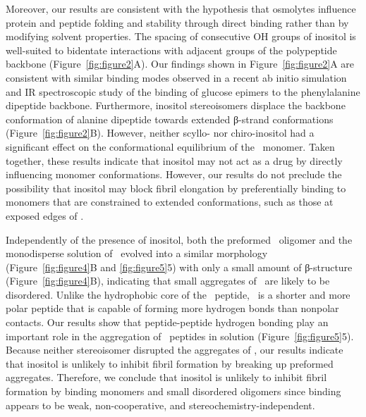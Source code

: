 Moreover, our results are consistent with the hypothesis that osmolytes influence protein and peptide folding and stability through direct binding rather than by modifying solvent properties.\cite{Canchi:2011p53,Lee:2010p59,Street:2006p21} The spacing of consecutive OH groups of inositol is well-suited to bidentate interactions with adjacent groups of the polypeptide backbone (Figure~\ref{fig:figure2}A). Our findings shown in Figure~\ref{fig:figure2}A are consistent with similar binding modes observed in a recent ab initio simulation and IR spectroscopic study of the binding of glucose epimers to the phenylalanine dipeptide backbone.\cite{Cocinero:2011p54} Furthermore, inositol stereoisomers displace the backbone conformation of alanine dipeptide towards extended β-strand conformations (Figure~\ref{fig:figure2}B). However, neither scyllo- nor chiro-inositol had a significant effect on the conformational equilibrium of the \gafour\ monomer. Taken together, these results indicate that inositol may not act as a drug by directly influencing monomer conformations. However, our results do not preclude the possibility that inositol may block fibril elongation by preferentially binding to monomers that are constrained to extended conformations, such as those at exposed edges of \bsheets.

Independently of the presence of inositol, both the preformed \bsheet\ oligomer and the monodisperse solution of \gafour\ evolved into a similar morphology (Figure~\ref{fig:figure4}B and \ref{fig:figure5}5) with only a small amount of β-structure (Figure~\ref{fig:figure4}B), indicating that small aggregates of \gafour\ are likely to be disordered. Unlike the hydrophobic core of the \abeta\ peptide, \gafour\ is a shorter and more polar peptide that is capable of forming more hydrogen bonds than nonpolar contacts. Our results show that peptide-peptide hydrogen bonding play an important role in the aggregation of \gafour\ peptides in solution (Figure~\ref{fig:figure5}5). Because neither stereoisomer disrupted the aggregates of \gafour, our results indicate that inositol is unlikely to inhibit fibril formation by breaking up preformed aggregates. Therefore, we conclude that inositol is unlikely to inhibit fibril formation by binding monomers and small disordered oligomers since binding appears to be weak, non-cooperative, and stereochemistry-independent.

